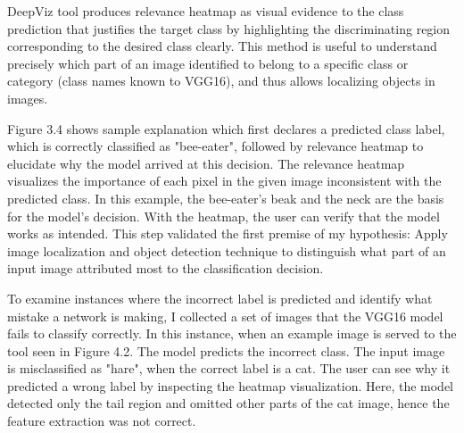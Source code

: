 DeepViz tool produces relevance heatmap as visual evidence to the class prediction that justifies the target class by highlighting the discriminating region corresponding to the desired class clearly. This method is useful to understand precisely which part of an image identified to belong to a specific class or category (class names known to VGG16), and thus allows localizing objects in images.

Figure 3.4 shows sample explanation which first declares a predicted class label, which is correctly classified as "bee-eater", followed by relevance heatmap to elucidate why the model arrived at this decision. The relevance heatmap visualizes the importance of each pixel in the given image inconsistent with the predicted class. In this example, the bee-eater's beak and the neck are the basis for the model's decision. With the heatmap, the user can verify that the model works as intended.  This step validated the first premise of my hypothesis: Apply image localization and object detection technique to distinguish what part of an input image attributed most to the classification decision.

To examine instances where the incorrect label is predicted and identify what mistake a network is making, I collected a set of images that the VGG16 model fails to classify correctly. In this instance, when an example image is served to the tool seen in Figure 4.2. The model predicts the incorrect class. The input image is misclassified as "hare", when the correct label is a cat. The user can see why it predicted a wrong label by inspecting the heatmap visualization. Here, the model detected only the tail region and omitted other parts of the cat image, hence the feature extraction was not correct.

